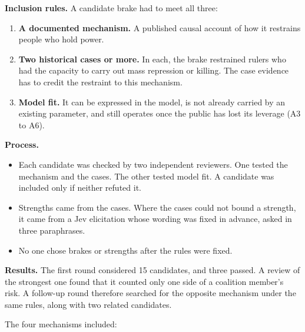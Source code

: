 \documentclass[
  10pt,
]{article}
\providecommand{\tightlist}{%
  \setlength{\itemsep}{0pt}\setlength{\parskip}{0pt}}
\begin{document}
\textbf{Inclusion rules.} A candidate brake had to meet all three:

\begin{enumerate}
\def\labelenumi{\arabic{enumi}.}
\tightlist
\item
  \textbf{A documented mechanism.} A published causal account of how it restrains people who hold
  power.
\item
  \textbf{Two historical cases or more.} In each, the brake restrained rulers who had the capacity
  to carry out mass repression or killing. The case evidence has to credit the restraint to this
  mechanism.
\item
  \textbf{Model fit.} It can be expressed in the model, is not already carried by an existing
  parameter, and still operates once the public has lost its leverage (A3 to A6).
\end{enumerate}

\textbf{Process.}

\begin{itemize}
\tightlist
\item
  Each candidate was checked by two independent reviewers. One tested the mechanism and the cases.
  The other tested model fit. A candidate was included only if neither refuted it.
\item
  Strengths came from the cases. Where the cases could not bound a strength, it came from a Jev
  elicitation whose wording was fixed in advance, asked in three paraphrases.
\item
  No one chose brakes or strengths after the rules were fixed.
\end{itemize}

\textbf{Results.} The first round considered 15 candidates, and three passed. A review of the
strongest one found that it counted only one side of a coalition member's risk. A follow-up round
therefore searched for the opposite mechanism under the same rules, along with two related
candidates.

The four mechanisms included:
\end{document}
